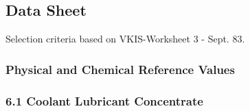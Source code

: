 \subsection{Data Sheet}

Selection criteria based on VKIS-Worksheet 3 - Sept. 83.

\subsubsection*{Physical and Chemical Reference Values}

\subsubsection*{6.1 Coolant Lubricant Concentrate}

\renewcommand{\arraystretch}{1.3}
